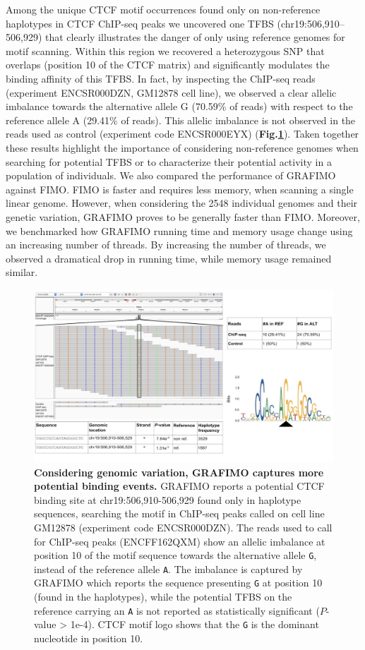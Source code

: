 \documentclass[a4paper, titlepage, openright]{book}
\begin{document}
Among the unique CTCF motif occurrences found only on non-reference haplotypes in CTCF ChIP-seq peaks we uncovered one TFBS (chr19:506,910–506,929) that clearly illustrates the danger of only using reference genomes for motif scanning. Within this region we recovered a heterozygous SNP that overlaps (position 10 of the CTCF matrix) and significantly modulates the binding affinity of this TFBS. In fact, by inspecting the ChIP-seq reads (experiment ENCSR000DZN, GM12878 cell line), we observed a clear allelic imbalance towards the alternative allele G (70.59\% of reads) with respect to the reference allele A (29.41\% of reads). This allelic imbalance is not observed in the reads used as control (experiment code ENCSR000EYX) (\textbf{Fig.\ref{fig:grafimo3}}). Taken together these results highlight the importance of considering non-reference genomes when searching for potential TFBS or to characterize their potential activity in a population of individuals. We also compared the performance of GRAFIMO against FIMO. FIMO is faster and requires less memory, when scanning a single linear genome. However, when considering the 2548 individual genomes and their genetic variation, GRAFIMO proves to be generally faster than FIMO. Moreover, we benchmarked how GRAFIMO running time and memory usage change using an increasing number of threads.  By increasing the number of threads, we observed a dramatical drop in running time, while memory usage remained similar.
\begin{figure}
	\centering
	\includegraphics[width=\textwidth]{figures/grafimo3.jpg}
	\caption[Considering genomic variation, GRAFIMO captures more potential binding events]{\textbf{Considering genomic variation, GRAFIMO captures more potential binding events.} GRAFIMO reports a potential CTCF binding site at chr19:506,910-506,929 found only in haplotype sequences, searching the motif in ChIP-seq peaks called on cell line GM12878 (experiment code ENCSR000DZN). The reads used to call for ChIP-seq peaks (ENCFF162QXM) show an allelic imbalance at position 10 of the motif sequence towards the alternative allele \texttt{G}, instead of the reference allele \texttt{A}. The imbalance is captured by GRAFIMO which reports the sequence presenting \texttt{G} at position 10 (found in the haplotypes), while the potential TFBS on the reference carrying an \texttt{A} is not reported as statistically significant ($P$-value > 1e-4). CTCF motif logo shows that the \texttt{G} is the dominant nucleotide in position 10.}
	\label{fig:grafimo3}
\end{figure} 
\end{document}
